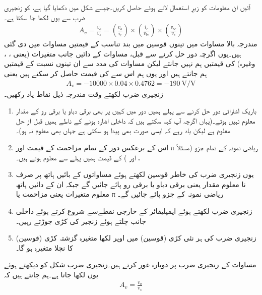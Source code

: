 آئیں ان معلومات کو زیرِ استعمال لاتے ہوئے  حاصل کریں۔جیسے شکل   میں دکھایا گیا ہے،  کو زنجیری ضرب سے یوں لکھا جا سکتا ہے۔
\begin{align} \label{مساوات_ٹرانزسٹر_زنجیری_ضرب_مثال_الف}
A_v =\frac{v_o}{v_s}= \left (\frac{v_o}{i_c} \right) \times \left (\frac{i_c}{v_{be}} \right)   \times \left (\frac{v_{be}}{v_s} \right) 
\end{align}
مندرجہ بالا مساوات میں تینوں قوسین میں بند تناسب کے قیمتیں مساوات   میں دی گئی ہیں۔یوں اگرچہ دور حل کرنے سے قبل، مساوات   کے دائیں جانب متغیرات (یعنی ، ،  وغیرہ) کی قیمتیں ہم نہیں جانتے لیکن مساوات   کی مدد سے ان تینوں نسبت کے قیمتیں ہم جانتے ہیں اور یوں ہم اس سے  کی قیمت حاصل کر سکتے ہیں یعنی
\begin{align}
A_v = -10000  \times 0.04  \times 0.4762 =\SI[per=frac,fraction=nice]{-190}{\volt \per \volt}
\end{align}
	زنجیری ضرب لکھتے وقت مندرجہ ذیل نقاط یاد رکھیں۔
\begin{enumerate}
\item
باریک اشاراتی دور حل کرنے سے پہلے ہمیں دور میں کہیں پر بھی برقی دباو یا برقی رو کے مقدار معلوم نہیں ہوتے۔(یہاں اگرچہ آپ کہہ سکتے ہیں کہ  داخلی اشارہ ہونے کے ناطے ہمیں قبل از حل معلوم ہے لیکن یاد رہے کہ ایسی صورت بھی پیدا ہو سکتی ہے جہاں  بھی معلوم نہ ہو)۔
\item
اس کے برعکس دور کے تمام مزاحمت کے قیمت اور π ریاضی نمونہ  کے تمام جزو  (مسئلاً  ،  اور  ) کے قیمت ہمیں پہلے سے معلوم ہوتے ہیں۔
\item
یوں زنجیری ضرب کی خاطر قوسین لکھتے ہوئے مساواتوں کے بائیں ہاتھ پر صرف نا معلوم مقدار یعنی برقی دباو یا برقی رو پائے جائیں گے جبکہ ان کے دائیں ہاتھ معلوم متغیرات یعنی مزاحمت یا π ریاضی نمونہ  کے جزو پائے جائیں گے۔
\item
زنجیری ضرب لکھتے ہوئے ایمپلیفائر کے خارجی نقطےسے شروع کرتے ہوئے داخلی جانب چلتے ہوئے زنجیر کی کڑی جوڑتے رہیں۔
\item
زنجیری ضرب کی ہر نئی کڑی (قوسین) میں اوپر لکھا متغیرہ گزشتہ کڑی (قوسین) کا 	نچلا متغیرہ ہو گا۔
\end{enumerate}
	مساوات   کے زنجیری ضرب پر دوبارہ غور کرتے ہیں۔زنجیری ضرب شکل   کو دیکھتے ہوئے یوں لکھا جاتا ہے۔ہم جانتے ہیں کہ
\begin{align*}
A_v=\frac{v_o}{v_s}
\end{align*}
